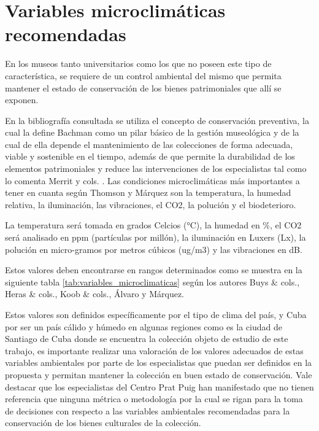 
    \section{Variables microclimáticas recomendadas}

    En los museos tanto universitarios como los que no poseen este tipo de característica, se requiere de un control ambiental del mismo que permita mantener el estado de conservación de los bienes patrimoniales que allí se exponen.

    En la bibliografía consultada se utiliza el concepto de conservación preventiva, la cual la define Bachman \cite{bachmann1992conservation} como un pilar básico de la gestión museológica y de la cual de ella depende el mantenimiento de las colecciones de forma adecuada, viable y sostenible en el tiempo, además de que permite la durabilidad de los elementos patrimoniales y reduce las intervenciones de los especialistas tal como lo comenta Merrit y cols. \cite{merrittPreventiveConservationHistoric2010}. Las condiciones microclimáticas más importantes a tener en cuanta según Thomson \cite{thomsonMuseumEnvironment2018} y Márquez \cite{marquezAgentesDeterioroMedioambientales2016} son la temperatura, la humedad relativa, la iluminación, las vibraciones, el CO2, la polución y el biodeterioro.

    La temperatura será tomada en grados Celcios (°C), la humedad en \%, el CO2 será analisado en ppm (partículas por millón), la iluminación en Luxers (Lx), la polución en micro-gramos por metros cúbicos (ug/m3) y las vibraciones en dB.

    Estos valores deben encontrarse en rangos determinados como se muestra en la siguiente tabla \ref{tab:variables_microclimaticas} según los autores Buys \& cols., Heras \& cols., Koob \& cols., Álvaro y Márquez.

    Estos valores son definidos específicamente por el tipo de clima del país, y Cuba por ser un país cálido y húmedo en algunas regiones como es la ciudad de Santiago de Cuba donde se encuentra la colección objeto de estudio de este trabajo,
    es importante realizar una valoración de los valores adecuados de estas variables ambientales por parte de los especialistas que puedan ser definidos en la propuesta y permitan mantener la colección en buen estado de conservación.
    Vale destacar que los especialistas del Centro Prat Puig han manifestado que no tienen referencia que ninguna métrica o metodología por la cual se rigan para la toma de decisiones con respecto a las variables ambientales recomendadas para la conservación de los bienes culturales de la colección.
    

